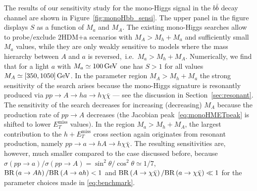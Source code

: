 \documentclass[a4paper, 11pt,notoc]{article}
\newcommand{\MET}{\ensuremath{E_T^\mathrm{miss}}\xspace}
\newcommand{\mA}{\ensuremath{M_{A}}\xspace}
\newcommand{\ma}{\ensuremath{M_{a}}\xspace}
\newcommand{\hdma}{\ensuremath{\textrm{2HDM+a}}\xspace}
\begin{document}
The results of our sensitivity study for the mono-Higgs signal in the $b \bar b$ decay channel are shown in Figure~\ref{fig:monoHbb_sensi}. The upper panel in the figure displays $S$  as a function of $\ma$ and $\mA$. %
The existing mono-Higgs searches allow to probe/exclude \hdma scenarios with  $\mA > M_h + \ma$  and sufficiently small $\ma$ values, while they are only weakly  sensitive to models where the mass hierarchy between $A$ and $a$ is reversed,~i.e.~$\ma > M_h + \mA$. Numerically, we find that  for  a light $a$ with $\ma \simeq 100 \, {\rm GeV}$ one has $S > 1$ for all values $\mA \simeq [350, 1050] \, {\rm GeV}$. In the parameter region  $\mA > M_h + \ma$ the strong sensitivity of the search arises because the mono-Higgs signature is resonantly produced via $pp \to A \to ha \to h \chi \bar \chi$ --- see the discussion in Section~\ref{sec:resonant}. The sensitivity of the search decreases for increasing (decreasing) $M_A$ because the production rate of $pp \to A$  decreases $\big($the Jacobian peak~\eqref{eq:monoHMETpeak} is shifted to lower $\MET$ values$\big)$. In the region $\ma > M_h + \mA$, the largest contribution to the $h + \MET$ cross section again originates from resonant production, namely $pp \to a \to hA \to h \chi \bar \chi$.  The resulting sensitivities are, however, much smaller compared to the case discussed before, because  $\sigma \left (p p \to a \right )/\sigma \left (pp \to A \right ) = \sin^2 \theta/\cos^2 \theta \simeq 1/7$, ${\rm BR} \left ( a \to A h \right )/{\rm BR} \left (  A \to a h  \right ) < 1$ and ${\rm BR} \left ( A \to \chi \bar \chi \right )/{\rm BR} \left (  a \to \chi \bar \chi \right ) \ll~\!\!1$ for the parameter choices made in \eqref{eq:benchmark}. 
\end{document}
